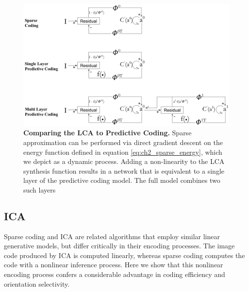 \begin{figure}[h]
    \centering
    \includegraphics[width=\textwidth]{./figures/lca_pc_model_comparisons.png}
    \caption{\textbf{Comparing the LCA to Predictive Coding.} Sparse approximation can be performed via direct gradient descent on the energy function defined in equation \eqref{eq:ch2_sparse_energy}, which we depict as a dynamic process. Adding a non-linearity to the LCA synthesis function results in a network that is equivalent to a single layer of the predictive coding model. The full model combines two such layers \parencite{rao1999predictive}}
    \label{fig:ch2_lca_pc_comp}
\end{figure}




\subsection{ICA}
Sparse coding and ICA are related algorithms that employ similar linear generative models, but differ critically in their encoding processes. The image code produced by ICA is computed linearly, whereas sparse coding computes the code with a nonlinear inference process. Here we show that this nonlinear encoding process confers a considerable advantage in coding efficiency and orientation selectivity.

